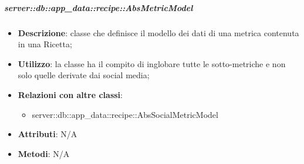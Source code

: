 		\subparagraph{server::db::app\_data::recipe::AbsMetricModel} %
		\label{subp:server_db_app_data_recipe_absmetricmodel}
			\begin{itemize}
				\item \textbf{Descrizione}: classe che definisce il modello dei dati di una metrica contenuta in una Ricetta;
				\item \textbf{Utilizzo}: la classe ha il compito di inglobare tutte le sotto-metriche e non solo quelle derivate dai social media;
				\item \textbf{Relazioni con altre classi}:
					\begin{itemize}
						\item server::db::app\_data::recipe::AbsSocialMetricModel
					\end{itemize}
				\item \textbf{Attributi}: N/A
				\item \textbf{Metodi}: N/A
			\end{itemize}


